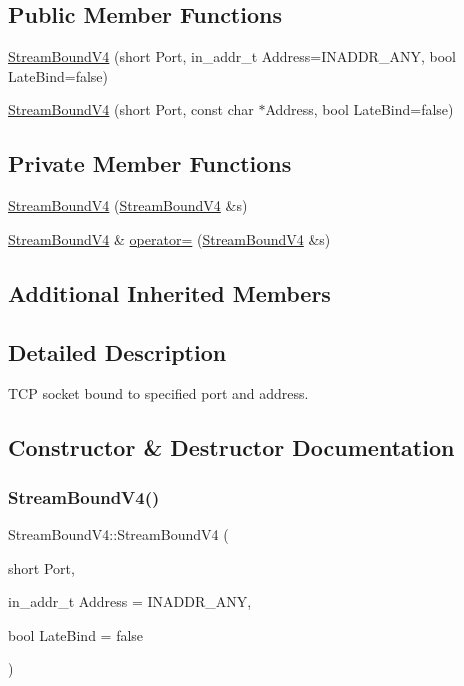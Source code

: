 \subsection*{Public Member Functions}
\begin{DoxyCompactItemize}
\item 
\hyperlink{classStreamBoundV4_ae29ec7a9e59a9e3aef01c4251113cbca}{Stream\+Bound\+V4} (short Port, in\+\_\+addr\+\_\+t Address=I\+N\+A\+D\+D\+R\+\_\+\+A\+NY, bool Late\+Bind=false)
\item 
\hyperlink{classStreamBoundV4_ab070a58759e73f5407b4766d1629c708}{Stream\+Bound\+V4} (short Port, const char $\ast$Address, bool Late\+Bind=false)
\end{DoxyCompactItemize}
\subsection*{Private Member Functions}
\begin{DoxyCompactItemize}
\item 
\hyperlink{classStreamBoundV4_a8a78f05c41413598bfc662417e8dbeb5}{Stream\+Bound\+V4} (\hyperlink{classStreamBoundV4}{Stream\+Bound\+V4} \&s)
\item 
\hyperlink{classStreamBoundV4}{Stream\+Bound\+V4} \& \hyperlink{classStreamBoundV4_a762eb400e5cfc54f2f2f5b1df48a616e}{operator=} (\hyperlink{classStreamBoundV4}{Stream\+Bound\+V4} \&s)
\end{DoxyCompactItemize}
\subsection*{Additional Inherited Members}


\subsection{Detailed Description}
T\+CP socket bound to specified port and address. 

\subsection{Constructor \& Destructor Documentation}
\mbox{\label{classStreamBoundV4_ae29ec7a9e59a9e3aef01c4251113cbca}} 
\subsubsection{\texorpdfstring{Stream\+Bound\+V4()}{StreamBoundV4()}\hspace{0.1cm}{\footnotesize\ttfamily [1/3]}}
{\footnotesize\ttfamily Stream\+Bound\+V4\+::\+Stream\+Bound\+V4 (\begin{DoxyParamCaption}\item[{short}]{Port,  }\item[{in\+\_\+addr\+\_\+t}]{Address = {\ttfamily INADDR\+\_\+ANY},  }\item[{bool}]{Late\+Bind = {\ttfamily false} }\end{DoxyParamCaption})}

